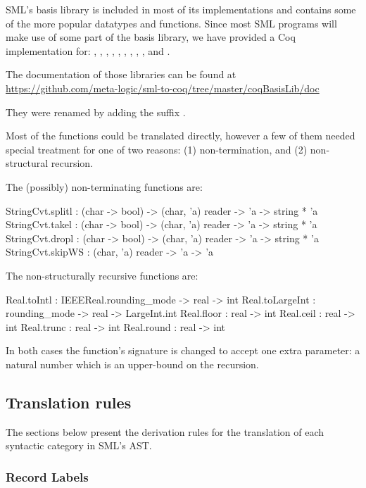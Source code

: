 \documentclass[a4paper,11pt]{article}
\begin{document}
SML's basis library is included in most of its implementations and
contains some of the more popular datatypes and functions. Since most
SML programs will make use of some part of the basis library, we have
provided a Coq implementation for:
,
,
,
,
,
,
,
,
, and
.

The documentation of those libraries can be found at\\
\url{https://github.com/meta-logic/sml-to-coq/tree/master/coqBasisLib/doc}

They were renamed by adding the suffix .

Most of the functions could be translated directly, however a few of
them needed special treatment for one of two reasons: (1)
non-termination, and (2) non-structural recursion. 

The (possibly) non-terminating functions are:
\begin{sml}
StringCvt.splitl : (char -> bool) -> (char, 'a) reader -> 'a -> string * 'a
StringCvt.takel  : (char -> bool) -> (char, 'a) reader -> 'a -> string * 'a
StringCvt.dropl  : (char -> bool) -> (char, 'a) reader -> 'a -> string * 'a
StringCvt.skipWS : (char, 'a) reader -> 'a -> 'a
\end{sml}

The non-structurally recursive functions are:
\begin{sml}
Real.toIntl : IEEEReal.rounding_mode -> real -> int
Real.toLargeInt : rounding_mode -> real -> LargeInt.int
Real.floor : real -> int
Real.ceil  : real -> int
Real.trunc : real -> int
Real.round : real -> int
\end{sml}

In both cases the function's signature is changed to accept
one extra parameter: a natural number which is an upper-bound on the
recursion.

\subsection{Translation rules}

The sections below present the derivation rules for the translation of
each syntactic category in SML's AST.

\subsubsection{Record Labels}
\end{document}
